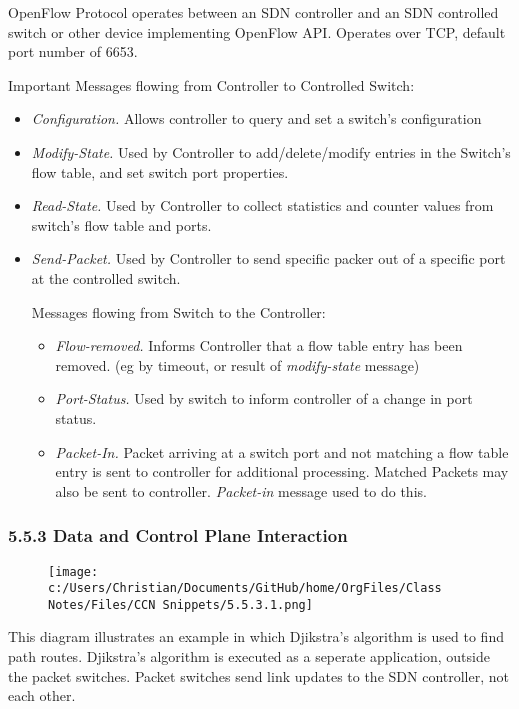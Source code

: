 \documentclass[11pt]{article}
\begin{document}
OpenFlow Protocol operates between an SDN controller and an SDN controlled switch or other device implementing OpenFlow API. Operates over TCP, default port number of 6653.

Important Messages flowing from Controller to Controlled Switch:
\begin{itemize}
\item \emph{Configuration.} Allows controller to query and set a switch's configuration
\item \emph{Modify-State.} Used by Controller to add/delete/modify entries in the Switch's flow table, and set switch port properties.
\item \emph{Read-State.} Used by Controller to collect statistics and counter values from switch's flow table and ports.
\item \emph{Send-Packet.} Used by Controller to send specific packer out of a specific port at the controlled switch.

Messages flowing from Switch to the Controller:
\begin{itemize}
\item \emph{Flow-removed.} Informs Controller that a flow table entry has been removed. (eg by timeout, or result of \emph{modify-state} message)
\item \emph{Port-Status.} Used by switch to inform controller of a change in port status.
\item \emph{Packet-In.} Packet arriving at a switch port and not matching a flow table entry is sent to controller for additional processing. Matched Packets may also be sent to controller. \emph{Packet-in} message used to do this.
\end{itemize}
\end{itemize}

\subsubsection{5.5.3 Data and Control Plane Interaction}
\label{sec:org74356fd}

\begin{figure}[htbp]
\centering
\texttt{[image: c:/Users/Christian/Documents/GitHub/home/OrgFiles/Class Notes/Files/CCN Snippets/5.5.3.1.png]}
\end{figure}

This diagram illustrates an example in which Djikstra's algorithm is used to find path routes.
Djikstra's algorithm is executed as a seperate application, outside the packet switches.
Packet switches send link updates to the SDN controller, not each other.
\end{document}
